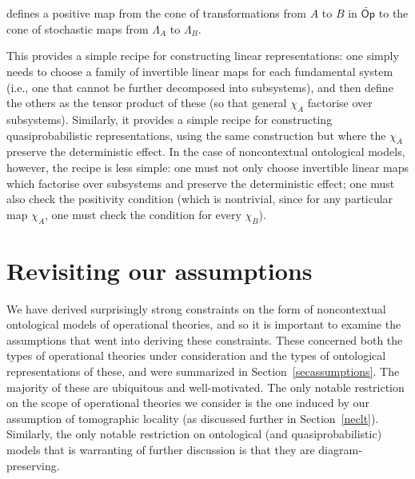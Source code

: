 \documentclass[10pt,twocolumn,aps,groupedaddress,nofootinbib]{revtex4}
\newcommand\Op{\mathsf{Op}}
\begin{document}
\quad  \mapsto \quad{}
\eeq
defines a positive map from the cone of transformations from $A$ to $B$ in $\widetilde{\Op}$ to the cone of stochastic maps from $\Lambda_A$ to $\Lambda_B$.

This provides a simple recipe for constructing linear representations: one simply needs to choose a family of invertible linear maps for each fundamental system (i.e., one that cannot be further decomposed into subsystems),
 and then define the others as the tensor product of these (so that general $\chi_A$ factorise over subsystems). Similarly, it provides a simple recipe for constructing quasiprobabilistic representations, using the same construction but where the $\chi_A$ preserve the deterministic effect. In the case of noncontextual ontological models, however, the recipe is less simple: one must not only choose invertible linear maps which  factorise over subsystems and preserve the deterministic effect; one must also check the positivity condition (which is nontrivial, since for any particular map $\chi_A$, one must check the condition for every $\chi_B$).

\section{Revisiting our assumptions} \label{revisassump}

We have derived surprisingly strong constraints on the form of noncontextual ontological models of operational theories,
and so it is important to examine the assumptions that went into deriving these constraints.
These concerned both the types of operational theories under consideration and the types of ontological representations of these,
and were summarized in Section~\ref{secassumptions}. The majority of these are ubiquitous and well-motivated.
The only notable restriction on the scope of operational theories we consider is the one induced by our  assumption of tomographic locality  (as discussed further in Section~\ref{neclt}).
Similarly, the only notable restriction
on ontological (and quasiprobabilistic) models that is warranting of further discussion is that they are diagram-preserving.
\end{document}
